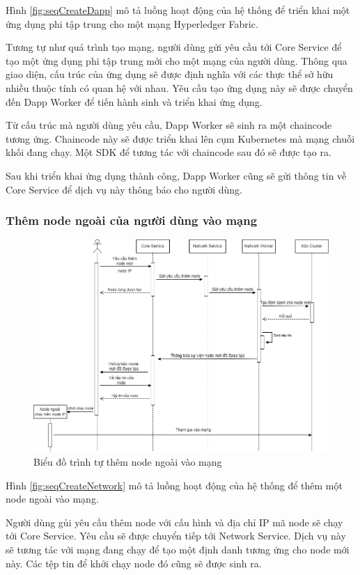 \documentclass[../DoAn.tex]{subfiles}
\begin{document}
Hình \ref{fig:seqCreateDapp} mô tả luồng hoạt động của hệ thống để triển
khai một ứng dụng phi tập trung cho một mạng Hyperledger Fabric.

Tương tự như quá trình tạo mạng, người dùng gửi yêu cầu tới Core Service để tạo
một ứng dụng phi tập trung mới cho một mạng của người dùng. Thông qua giao
diện, cấu trúc của ứng dụng sẽ được định nghĩa với các thực thể sở hữu nhiều
thuộc tính có quan hệ với nhau. Yêu cầu tạo ứng dụng này sẽ được chuyển đến
Dapp Worker để tiến hành sinh và triển khai ứng dụng.

Từ cấu trúc mà người dùng yêu cầu, Dapp Worker sẽ sinh ra một chaincode tương
ứng. Chaincode này sẽ được triển khai lên cụm Kubernetes mà mạng chuỗi khối
đang chạy. Một SDK để tương tác với chaincode sau đó sẽ được tạo ra.

Sau khi triển khai ứng dụng thành công, Dapp Worker cũng sẽ gửi thông tin về
Core Service để dịch vụ này thông báo cho người dùng.

\subsubsection{Thêm node ngoài của người dùng vào mạng}

\begin{figure}[H]
    \centering
    \includegraphics[width=0.75\linewidth]{Hinhve/DoAn-seqAddNode.drawio.png}
    \caption{Biểu đồ trình tự thêm node ngoài vào mạng}
    \label{fig:seqAddNode}
\end{figure}

Hình \ref{fig:seqCreateNetwork} mô tả luồng hoạt động của hệ thống để thêm một
node ngoài vào mạng.

Người dùng gủi yêu cầu thêm node với cấu hình và địa chỉ IP mã node sẽ chạy tới
Core Service. Yêu cầu sẽ được chuyển tiếp tới Network Service. Dịch vụ này sẽ
tương tác với mạng đang chạy để tạo một định danh tương ứng cho node mới này.
Các tệp tin để khởi chạy node đó cũng sẽ được sinh ra.
\end{document}
